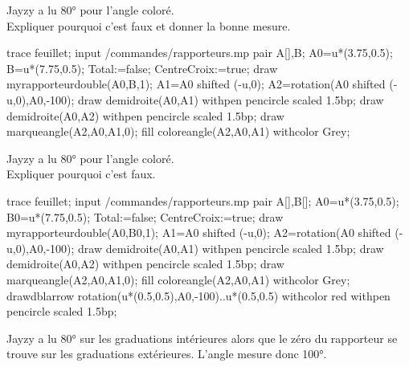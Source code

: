 \begin{exercice*}
   Jayzy a lu \ang{80} pour l'angle coloré.\\
   Expliquer pourquoi c'est faux et donner la bonne mesure.\\

   \begin{Geometrie}[CoinHD={(7.5u,4.5u)}]
      trace feuillet;
      input \persopath/commandes/rapporteurs.mp
      pair A[],B;
      A0=u*(3.75,0.5);
      B=u*(7.75,0.5);
      Total:=false;%
      CentreCroix:=true;%
      draw myrapporteurdouble(A0,B,1);        
      A1=A0 shifted (-u,0); 
      A2=rotation(A0 shifted (-u,0),A0,-100);           
      draw demidroite(A0,A1) withpen pencircle scaled 1.5bp;
      draw demidroite(A0,A2) withpen pencircle scaled 1.5bp;
      draw marqueangle(A2,A0,A1,0);
      fill coloreangle(A2,A0,A1) withcolor Grey;
   \end{Geometrie}
   \par\vspace*{4mm}\dotfill
   \par\vspace*{4mm}\dotfill
   \par\vspace*{4mm}\dotfill
   \par\vspace*{4mm}\dotfill
\end{exercice*}
\begin{corrige}
   Jayzy a lu \ang{80} pour l'angle coloré.\\
   Expliquer pourquoi c'est faux.\\

   \begin{Geometrie}[CoinHD={(7.5u,4.5u)}]
      trace feuillet;
      input \persopath/commandes/rapporteurs.mp
      pair A[],B[];
      A0=u*(3.75,0.5);
      B0=u*(7.75,0.5);
      Total:=false;%
      CentreCroix:=true;%
      draw myrapporteurdouble(A0,B0,1);        
      A1=A0 shifted (-u,0); 
      A2=rotation(A0 shifted (-u,0),A0,-100);           
      draw demidroite(A0,A1) withpen pencircle scaled 1.5bp;
      draw demidroite(A0,A2) withpen pencircle scaled 1.5bp;
      draw marqueangle(A2,A0,A1,0);
      fill coloreangle(A2,A0,A1) withcolor Grey;
      drawdblarrow rotation(u*(0.5,0.5),A0,-100)..u*(0.5,0.5) withcolor red withpen pencircle scaled 1.5bp;
   \end{Geometrie}

   {\red 
   Jayzy a lu \ang{80} sur les graduations intérieures alors que le zéro du rapporteur se trouve sur les graduations extérieures.
   L'angle mesure donc \ang{100}.
   }
\end{corrige}